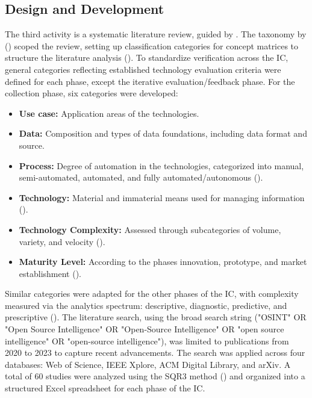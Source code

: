 \documentclass[10pt]{article}
\begin{document}
\subsection{Design and Development}
The third activity is a systematic literature review, guided by \textcite{Cleven.2009}.  The taxonomy by (\cite{Cooper.1988}) scoped the review, setting up classification categories for concept matrices to structure the literature analysis (\cite{Webster.2002}).
To standardize verification across the IC, general categories reflecting established technology evaluation criteria were defined for each phase, except the iterative evaluation/feedback phase. For the collection phase, six categories were developed:
\begin{itemize}
    \item \textbf{Use case:} Application areas of the technologies.
    \item \textbf{Data:} Composition and types of data foundations, including data format and source.
    \item \textbf{Process:} Degree of automation in the technologies, categorized into manual, semi-automated, automated, and fully automated/autonomous (\cite{Duncheon.2002, Billings.1997, Endsley.1999}).
    \item \textbf{Technology:} Material and immaterial means used for managing information (\cite{Bleck.2004}).
    \item \textbf{Technology Complexity:} Assessed through subcategories of volume, variety, and velocity (\cite{Elgendy.2014}).
    \item \textbf{Maturity Level:} According to the phases innovation, prototype, and  market establishment (\cite{Stich.2022}).
\end{itemize}

Similar categories were adapted for the other phases of the IC, with complexity measured via the analytics spectrum: descriptive, diagnostic, predictive, and prescriptive (\cite{Delen.2013}).
The literature search, using the broad search string ("OSINT" OR "Open Source Intelligence" OR "Open-Source Intelligence" OR "open source intelligence" OR "open-source intelligence"), was limited to publications from 2020 to 2023 to capture recent advancements. The search was applied across four databases: Web of Science, IEEE Xplore, ACM Digital Library, and arXiv. A total of 60 studies were analyzed using the SQR3 method (\cite{Robinson.1970}) and organized into a structured Excel spreadsheet for each phase of the IC.
\end{document}
